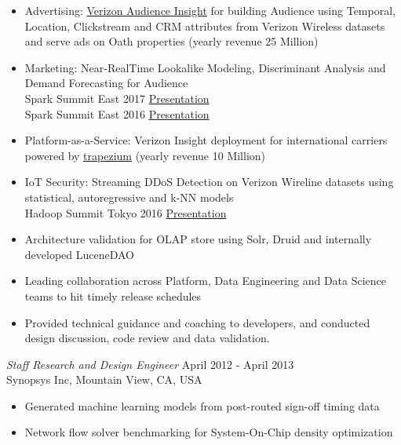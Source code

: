 \documentclass[margin]{res}
\begin{document}
\begin{resume}
\begin{itemize}
\item Advertising: \href{https://verizoninsights.verizon.com} {Verizon
  Audience Insight} for building Audience using Temporal, Location,
  Clickstream and CRM attributes from Verizon Wireless datasets and 
  serve ads on Oath properties (yearly revenue 25 Million)

\item Marketing: Near-RealTime Lookalike Modeling, Discriminant Analysis and Demand Forecasting for Audience\\
Spark Summit East 2017 
\href{https://spark-summit.org/east-2017/events/realtime-analytical-query-processing-and-predictive-model-building-on-high-dimensional-document-datasets-with-timestamps}{Presentation}\\
Spark Summit East 2016 \href{http://www.slideshare.net/SparkSummit/spark-summit-eu-talk-by-debasish-das-and-pramod-narasimha-68928564}{Presentation}

\item Platform-as-a-Service: Verizon Insight deployment for international carriers powered by \href{https://github.com/Verizon/trapezium}{trapezium} (yearly revenue 10 Million)

\item IoT Security: Streaming DDoS Detection on Verizon Wireline datasets using statistical, autoregressive and k-NN models\\
Hadoop Summit Tokyo 2016 \href{http://www.slideshare.net/HadoopSummit/near-realtime-network-anomaly-detection-and-traffic-analysis-using-spark-based-lambda-architecture}{Presentation}

\item Architecture validation for OLAP store using Solr, Druid and internally developed LuceneDAO 

\item Leading collaboration across Platform, Data Engineering and Data Science teams to hit timely release schedules

\item Provided technical guidance and coaching to developers, and conducted design discussion, code review and data validation.

\end{itemize}

{\sl Staff Research and Design Engineer} \hfill April 2012 - April 2013\\
Synopsys Inc, Mountain View, CA, USA
\begin{itemize} \itemsep -2pt
\item Generated machine learning models from post-routed sign-off timing data
\item Network flow solver benchmarking for System-On-Chip density optimization
\end{itemize}


\end{resume}
\end{document}
